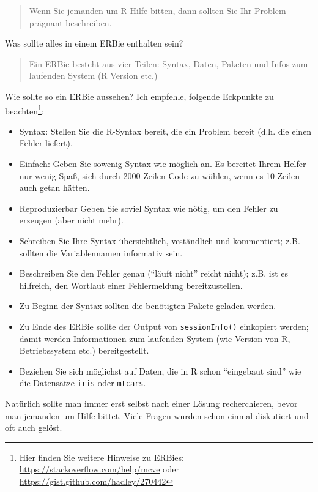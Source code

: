 \documentclass[12pt,ngerman,]{book}
\providecommand{\tightlist}{%
  \setlength{\itemsep}{0pt}\setlength{\parskip}{0pt}}
\let\rmarkdownfootnote\footnote%
\def\footnote{\protect\rmarkdownfootnote}
\theoremstyle{definition}
\theoremstyle{definition}
\theoremstyle{remark}
\begin{document}
\begin{quote}
Wenn Sie jemanden um R-Hilfe bitten, dann sollten Sie Ihr Problem
prägnant beschreiben.
\end{quote}

Was sollte alles in einem ERBie enthalten sein?

\begin{quote}
Ein ERBie besteht aus vier Teilen: Syntax, Daten, Paketen und Infos zum
laufenden System (R Version etc.)
\end{quote}

Wie sollte so ein ERBie aussehen? Ich empfehle, folgende Eckpunkte zu
beachten\footnote{Hier finden Sie weitere Hinweise zu ERBies:
  \url{https://stackoverflow.com/help/mcve} oder
  \url{https://gist.github.com/hadley/270442}}:

\begin{itemize}
\tightlist
\item
  Syntax: Stellen Sie die R-Syntax bereit, die ein Problem bereit (d.h.
  die einen Fehler liefert).
\item
  Einfach: Geben Sie sowenig Syntax wie möglich an. Es bereitet Ihrem
  Helfer nur wenig Spaß, sich durch 2000 Zeilen Code zu wühlen, wenn es
  10 Zeilen auch getan hätten.
\item
  Reproduzierbar Geben Sie soviel Syntax wie nötig, um den Fehler zu
  erzeugen (aber nicht mehr).
\item
  Schreiben Sie Ihre Syntax übersichtlich, veständlich und kommentiert;
  z.B. sollten die Variablennamen informativ sein.
\item
  Beschreiben Sie den Fehler genau (``läuft nicht'' reicht nicht); z.B.
  ist es hilfreich, den Wortlaut einer Fehlermeldung bereitzustellen.
\item
  Zu Beginn der Syntax sollten die benötigten Pakete geladen werden.
\item
  Zu Ende des ERBie sollte der Output von \texttt{sessionInfo()}
  einkopiert werden; damit werden Informationen zum laufenden System
  (wie Version von R, Betriebssystem etc.) bereitgestellt.
\item
  Beziehen Sie sich möglichst auf Daten, die in R schon ``eingebaut
  sind'' wie die Datensätze \texttt{iris} oder \texttt{mtcars}.
\end{itemize}

Natürlich sollte man immer erst selbst nach einer Lösung recherchieren,
bevor man jemanden um Hilfe bittet. Viele Fragen wurden schon einmal
diskutiert und oft auch gelöst.
\end{document}
